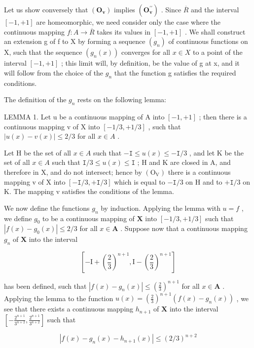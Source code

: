Let us show conversely that \((\mathbf{O}_{\mathbf{v}})\) implies \((\mathbf{O}_{\mathbf{v}}^{\prime\prime})\) . Since \(\overline{R}\) and the interval \([-1, +1]\) are homeomorphic, we need consider only the case where the continuous mapping \(f: A \to \overline{R}\) takes its values in \([-1, +1]\) . We shall construct an extension g of f to X by forming a sequence \((g_{n})\) of continuous functions on X, such that the sequence \((g_{n}(x))\) converges for all \(x \in X\) to a point of the interval \([-1, +1]\) ; this limit will, by definition, be the value of g at x, and it will follow from the choice of the \(g_{n}\) that the function g satisfies the required conditions.

The definition of the \(g_{n}\) rests on the following lemma:

LEMMA 1. Let u be a continuous mapping of A into \([-1, +1]\) ; then there is a continuous mapping v of X into \([-1/3, +1/3]\) , such that \(|u(x) - v(x)| \leqslant 2/3\) for all \(x \in A\) .

Let H be the set of all \(x \in A\) such that \(-\mathtt{I} \leqslant u(x) \leqslant -\mathtt{I}/3\) , and let K be the set of all \(x \in A\) such that \(\mathtt{I}/3 \leqslant u(x) \leqslant \mathtt{I}\) ; H and K are closed in A, and therefore in X, and do not intersect; hence by \((\mathrm{O}_{\mathrm{V}})\) there is a continuous mapping v of X into \([-\mathtt{I}/3, +\mathtt{I}/3]\) which is equal to \(-\mathtt{I}/3\) on H and to \(+\mathtt{I}/3\) on K. The mapping v satisfies the conditions of the lemma.

We now define the functions \(g_n\) by induction. Applying the lemma with \(u = f\) , we define \(g_0\) to be a continuous mapping of \(\mathbf{X}\) into \([-1/3, +1/3]\) such that \(|f(x) - g_0(x)| \leqslant 2/3\) for all \(x \in \mathbf{A}\) . Suppose now that a continuous mapping \(g_n\) of \(\mathbf{X}\) into the interval

\[
[ - \mathrm{I} + (\frac {2}{3}) ^ {n + 1}, \mathrm{I} - (\frac {2}{3}) ^ {n + 1} ]
\]

has been defined, such that \(|f(x) - g_n(x)| \leqslant (\frac{2}{3})^{n+1}\) for all \(x \in \mathbf{A}\) . Applying the lemma to the function \(u(x) = (\frac{2}{3})^{n+1} (f(x) - g_n(x))\) , we see that there exists a continuous mapping \(h_{n+1}\) of \(\mathbf{X}\) into the interval \(\left[-\frac{2^{n+1}}{3^{n+2}}, \frac{2^{n+1}}{3^{n+2}}\right]\) such that

\[
\left| f (x) - g _ {n} (x) - h _ {n + 1} (x) \right| \leqslant (2 / 3) ^ {n + 2}
\]

